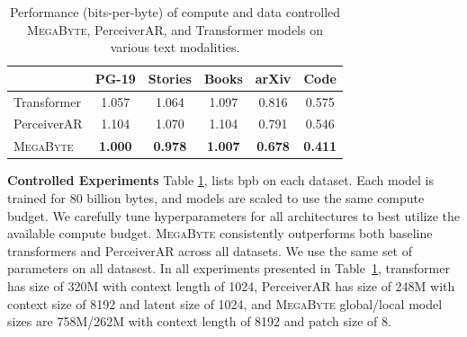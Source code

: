 \documentclass{article}
\newcommand{\fastslow}[0]{\textsc{MegaByte}\xspace}
\newcommand{\megabyte}[0]{\fastslow}
\theoremstyle{plain}
\theoremstyle{definition}
\theoremstyle{remark}
\begin{document}
\begin{table}[t]
\centering\small
\begin{tabular}{l|ccccc}
\toprule
& PG-19 & Stories & Books & arXiv & Code \\
\midrule
Transformer & 1.057 & 1.064 & 1.097 & 0.816 & 0.575 \\
PerceiverAR & 1.104 & 1.070 & 1.104 & 0.791 & 0.546 \\
\megabyte & \textbf{1.000} & \textbf{0.978} & \textbf{1.007} & \textbf{0.678} & \textbf{0.411} \\
\bottomrule
\end{tabular}
\caption{Performance (bits-per-byte) of compute and data controlled \megabyte, PerceiverAR, and Transformer models on various text modalities. }
\label{tab:text_exps}
\end{table}


\textbf{Controlled Experiments} Table \ref{tab:text_exps}, lists bpb on each dataset. Each model is trained for 80 billion bytes, and models are scaled to use the same compute budget. We carefully tune hyperparameters for all architectures to best utilize the available compute budget. \megabyte consistently outperforms both baseline transformers and PerceiverAR across all datasets. We use the same set of parameters on all datasest. In all experiments presented in Table~\ref{tab:text_exps}, transformer has size of 320M with context length of 1024, PerceiverAR has size of 248M with context size of 8192 and latent size of 1024, and \megabyte global/local model sizes are 758M/262M with context length of 8192 and patch size of 8. %
\end{document}
